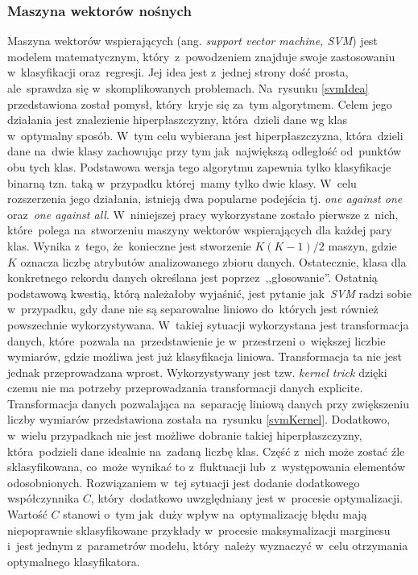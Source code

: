 \subsubsection{Maszyna wektorów nośnych}
Maszyna wektorów wspierających (ang. \textit{support vector machine, SVM}) jest modelem matematycznym, który~z~powodzeniem znajduje swoje zastosowaniu w~klasyfikacji oraz~regresji. Jej idea jest z~jednej strony dość prosta, ale~sprawdza się w~skomplikowanych problemach\cite{svm1}. Na~rysunku \ref{svmIdea} przedstawiona został pomysł, który~kryje się za~tym algorytmem. Celem jego działania jest znalezienie hiperpłaszczyzny, która~dzieli dane wg klas w~optymalny sposób. W~tym celu wybierana jest hiperpłaszczyzna, która~dzieli dane na~dwie klasy zachowując przy tym jak~największą odległość od~punktów obu tych klas\cite{svm2}. Podstawowa wersja tego algorytmu zapewnia tylko klasyfikacje binarną tzn. taką w~przypadku której~mamy tylko dwie klasy. W~celu rozszerzenia jego działania, istnieją dwa popularne podejścia  tj. \textit{one against one} oraz~\textit{one against all}\cite{svm3}. W~niniejszej pracy wykorzystane zostało pierwsze z~nich, które~polega na~stworzeniu maszyny wektorów wspierających dla każdej pary klas. Wynika z~tego, że~konieczne jest stworzenie $K(K-1)/2$ maszyn, gdzie ~$K$ oznacza liczbę atrybutów analizowanego zbioru danych. Ostatecznie, klasa dla konkretnego rekordu danych określana jest poprzez~,,głosowanie''. Ostatnią podstawową kwestią, którą należałoby wyjaśnić, jest pytanie jak~\textit{SVM} radzi sobie w~przypadku, gdy dane nie są separowalne liniowo do~których jest również powszechnie wykorzystywana. W~takiej sytuacji wykorzystana jest transformacja danych, które~pozwala na~przedstawienie je w~przestrzeni o~większej liczbie wymiarów, gdzie możliwa jest już klasyfikacja liniowa. Transformacja ta nie jest jednak przeprowadzana wprost. Wykorzystywany jest tzw. \textit{kernel trick} dzięki czemu nie ma potrzeby przeprowadzania transformacji danych explicite\cite{svmKernel}. Transformacja danych pozwalająca na~separację liniową danych przy zwiększeniu liczby wymiarów przedstawiona została na~rysunku \ref{svmKernel}. Dodatkowo, w~wielu przypadkach nie jest możliwe dobranie takiej hiperpłaszczyzny, która~podzieli dane idealnie na~zadaną liczbę klas. Część z~nich może zostać źle sklasyfikowana, co~może wynikać to z~fluktuacji lub~z~występowania elementów odosobnionych. Rozwiązaniem w~tej sytuacji jest dodanie dodatkowego współczynnika $C$, który~dodatkowo uwzględniany jest w~procesie optymalizacji. Wartość $C$ stanowi o~tym jak~duży wpływ na~optymalizację błędu mają niepoprawnie sklasyfikowane przykłady w~procesie maksymalizacji marginesu i~jest jednym z~parametrów modelu, który~należy wyznaczyć w~celu otrzymania optymalnego klasyfikatora. 

